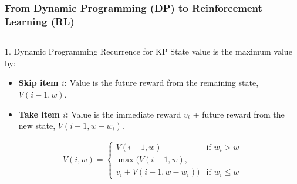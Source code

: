 \begin{frame}
    \frametitle{From Dynamic Programming (DP) to Reinforcement Learning (RL)}

    \begin{columns}[T]
        \begin{column}{0.5\textwidth}
            \begin{block}{1. Dynamic Programming Recurrence for KP}
                State value is the maximum value by:
                \begin{itemize}
                    \item \textbf{Skip item $i$:} Value is the future reward from the remaining state, $V(i-1, w)$.
                    \item \textbf{Take item $i$:} Value is the immediate reward $v_i$ + future reward from the new state, $V(i-1, w-w_i)$.
                \end{itemize}
                
                \begin{align*}
                    V(i, w) = 
                    \begin{cases}
                        V(i-1, w) & \text{if } w_i > w \\
                        \max( V(i-1, w), \\
                        v_i + V(i-1, w-w_i) ) & \text{if } w_i \le w
                    \end{cases}
                \end{align*}
            \end{block}
        \end{column}


\end{columns}
\end{frame}
